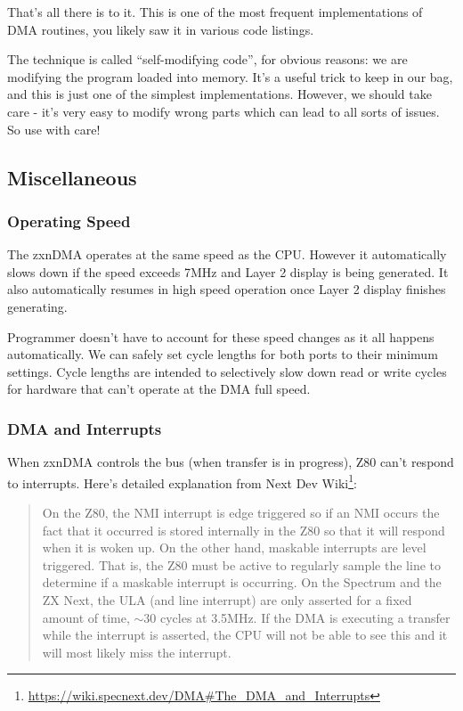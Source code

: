 {That's all there is to it. This is one of the most frequent implementations of DMA routines, you likely saw it in various code listings.

The technique is called ``self-modifying code'', for obvious reasons: we are modifying the program loaded into memory. It's a useful trick to keep in our bag, and this is just one of the simplest implementations. However, we should take care - it's very easy to modify wrong parts which can lead to all sorts of issues. So use with care!


\subsection{Miscellaneous}


\subsubsection{Operating Speed}

The zxnDMA operates at the same speed as the CPU. However it automatically slows down if the speed exceeds 7MHz and Layer 2 display is being generated. It also automatically resumes in high speed operation once Layer 2 display finishes generating.

Programmer doesn't have to account for these speed changes as it all happens automatically. We can safely set cycle lengths for both ports to their minimum settings. Cycle lengths are intended to selectively slow down read or write cycles for hardware that can't operate at the DMA full speed.


\subsubsection{DMA and Interrupts}

When zxnDMA controls the bus (when transfer is in progress), Z80 can't respond to interrupts. Here's detailed explanation from Next Dev Wiki\footnote{\url{https://wiki.specnext.dev/DMA\#The_DMA_and_Interrupts}}:

\vspace*{-1ex}
\begin{quote}
	On the Z80, the NMI interrupt is edge triggered so if an NMI occurs the fact that it occurred is stored internally in the Z80 so that it will respond when it is woken up. On the other hand, maskable interrupts are level triggered. That is, the Z80 must be active to regularly sample the  line to determine if a maskable interrupt is occurring. On the Spectrum and the ZX Next, the ULA (and line interrupt) are only asserted for a fixed amount of time, $\sim$30 cycles at 3.5MHz. If the DMA is executing a transfer while the interrupt is asserted, the CPU will not be able to see this and it will most likely miss the interrupt.
\end{quote}

}
